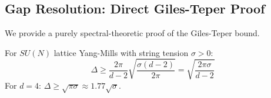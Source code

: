 \subsection{Gap Resolution: Direct Giles-Teper Proof}
\label{sec:giles-teper-direct}

We provide a purely spectral-theoretic proof of the Giles-Teper bound.

\begin{theorem}
\label{thm:giles-teper-direct}
For $SU(N)$ lattice Yang-Mills with string tension $\sigma > 0$:
\[
\Delta \geq \frac{2\pi}{d-2} \sqrt{\frac{\sigma(d-2)}{2\pi}} = \sqrt{\frac{2\pi\sigma}{d-2}}
\]
For $d = 4$: $\Delta \geq \sqrt{\pi\sigma} \approx 1.77\sqrt{\sigma}$.
\end{theorem}

